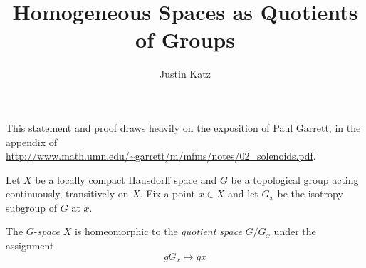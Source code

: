 \documentclass[11pt]{amsart}
\title{Homogeneous Spaces as Quotients of Groups}
\author{Justin Katz}
\begin{document}
\maketitle
This statement and proof draws heavily on the exposition of Paul Garrett, in the appendix of \url{http://www.math.umn.edu/~garrett/m/mfms/notes/02_solenoids.pdf}.

Let $X$ be a locally compact Hausdorff space and $G$ be a topological group acting continuously, transitively on $X$. Fix a point $x\in X$ and let $G_x$ be the isotropy subgroup of $G$ at $x$. 
\begin{claim}
	The $G$-\emph{space} $X$ is homeomorphic to the \emph{quotient space} $G/G_x$ under the assignment
	\begin{equation*}
		gG_x \mapsto gx
	\end{equation*}
\end{claim}
\end{document}
